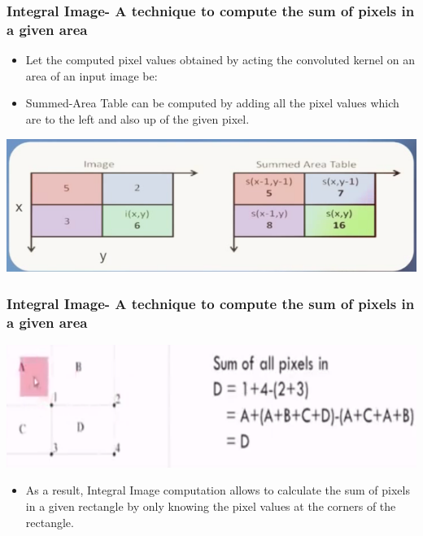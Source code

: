 \documentclass[•]{beamer}
\begin{document}
\begin{frame}
\frametitle{Integral Image- A technique to compute the sum of pixels in a given area}
\begin{itemize}
\item<1->{Let the computed pixel values obtained by acting the convoluted kernel on an area of an input image be:}
\item<2->{Summed-Area Table can be computed by adding all the pixel values which are to the left and also up of the given pixel.}
\end{itemize}
\centering\includegraphics[scale=0.6]{Capture1.PNG}
\end{frame}

\begin{frame}
\frametitle{Integral Image- A technique to compute the sum of pixels in a given area}
\centering\includegraphics[scale=0.6]{Capture2.PNG}
\begin{itemize}
\item<1->{As a result, Integral Image computation allows to calculate the sum of pixels in a given rectangle by only knowing the pixel values at the corners of the rectangle.}
\end{itemize}
\end{frame}
\end{document}
